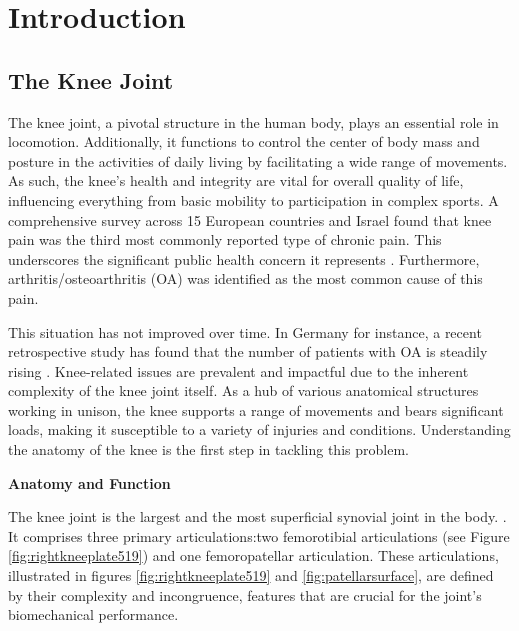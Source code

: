 \documentclass{micro-econ-thesis}
\begin{document}

\cleardoublepage
\pagestyle{headings}
\setcounter{page}{1}
\onehalfspacing %


\section{Introduction}
\label{sec:intro}


\subsection{The Knee Joint }
The knee joint, a pivotal structure in the human body, plays an essential role in locomotion. Additionally, it functions to control the center of body mass and posture in the activities of daily living by facilitating a wide range of movements. As such, the knee's health and integrity are vital for overall quality of life, influencing everything from basic mobility to participation in complex sports. A comprehensive survey across 15 European countries and Israel found that knee pain was the third most commonly reported type of chronic pain. This underscores the significant public health concern it represents \parencite{breivik_survey_2006}. Furthermore, arthritis/osteoarthritis (OA) was identified as the most common cause of this pain. 

This situation has not improved over time. In Germany for instance, a recent retrospective study has found that the number of patients with OA is steadily rising \parencite{obermuller_epidemiology_2024}. 
Knee-related issues are prevalent and impactful due to the inherent complexity of the knee joint itself. As a hub of various anatomical structures working in unison, the knee supports a range of movements and bears significant loads, making it susceptible to a variety of injuries and conditions.
Understanding the anatomy of the knee is the first step in tackling this problem. 

\textbf{Anatomy and Function}

The knee joint is the largest and the most superficial synovial joint in the body. \parencite{dalley_moores_2023}. 
It comprises three primary articulations:two femorotibial articulations (see Figure \ref{fig:rightkneeplate519}) and one femoropatellar articulation. These articulations, illustrated in figures \ref{fig:rightkneeplate519} and \ref{fig:patellarsurface}, are defined by their complexity and incongruence, features that are crucial for the joint's biomechanical performance. 
 
\end{document}
